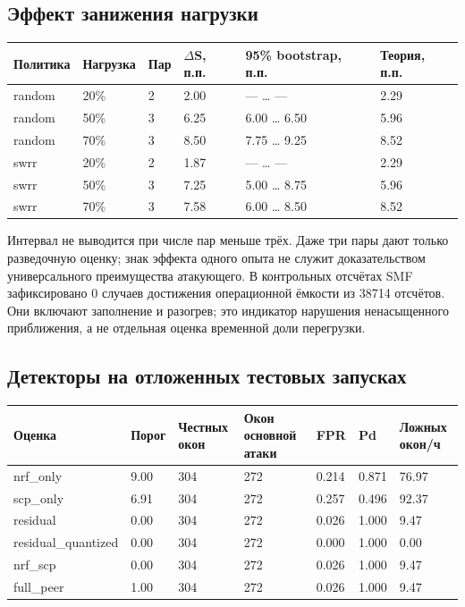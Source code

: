 \documentclass[11pt,a4paper]{article}
\begin{document}
\subsection*{Эффект занижения нагрузки}

{\footnotesize\setlength{\tabcolsep}{3pt}\renewcommand{\arraystretch}{1.25}
\begin{longtable}{p{2.53cm}p{2.53cm}p{2.53cm}p{2.53cm}p{2.53cm}p{2.53cm}}
\toprule
Политика & Нагрузка & Пар & \ensuremath{\Delta}S, п.п. & 95\% bootstrap, п.п. & Теория, п.п. \\
\midrule\endhead
random & 20\% & 2 & 2.00 & — \ldots{} — & 2.29 \\
random & 50\% & 3 & 6.25 & 6.00 \ldots{} 6.50 & 5.96 \\
random & 70\% & 3 & 8.50 & 7.75 \ldots{} 9.25 & 8.52 \\
swrr & 20\% & 2 & 1.87 & — \ldots{} — & 2.29 \\
swrr & 50\% & 3 & 7.25 & 5.00 \ldots{} 8.75 & 5.96 \\
swrr & 70\% & 3 & 7.58 & 6.00 \ldots{} 8.50 & 8.52 \\
\bottomrule\end{longtable}}

Интервал не выводится при числе пар меньше трёх. Даже три пары дают только разведочную оценку; знак эффекта одного опыта не служит доказательством универсального преимущества атакующего. В контрольных отсчётах SMF зафиксировано 0 случаев достижения операционной ёмкости из 38714 отсчётов. Они включают заполнение и разогрев; это индикатор нарушения ненасыщенного приближения, а не отдельная оценка временной доли перегрузки.

\subsection*{Детекторы на отложенных тестовых запусках}

{\footnotesize\setlength{\tabcolsep}{3pt}\renewcommand{\arraystretch}{1.25}
\begin{longtable}{p{2.13cm}p{2.13cm}p{2.13cm}p{2.13cm}p{2.13cm}p{2.13cm}p{2.13cm}}
\toprule
Оценка & Порог & Честных окон & Окон основной атаки & FPR & Pd & Ложных окон/ч \\
\midrule\endhead
nrf\_only & 9.00 & 304 & 272 & 0.214 & 0.871 & 76.97 \\
scp\_only & 6.91 & 304 & 272 & 0.257 & 0.496 & 92.37 \\
residual & 0.00 & 304 & 272 & 0.026 & 1.000 & 9.47 \\
residual\_quantized & 0.00 & 304 & 272 & 0.000 & 1.000 & 0.00 \\
nrf\_scp & 0.00 & 304 & 272 & 0.026 & 1.000 & 9.47 \\
full\_peer & 1.00 & 304 & 272 & 0.026 & 1.000 & 9.47 \\
\bottomrule\end{longtable}}
\end{document}
